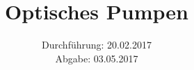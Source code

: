 

\subject{Versuch 21}
\title{Optisches Pumpen}
\date{Durchführung: 20.02.2017 \\
      Abgabe: 03.05.2017}



\maketitle
\newpage







\printbibliography


